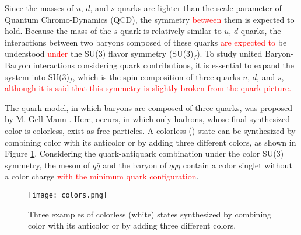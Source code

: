 Since the masses of $u$, $d$, and $s$ quarks are lighter than the scale parameter of Quantum Chromo-Dynamics (QCD), the symmetry \textcolor{red}{between} them is expected to hold. Because the mass of the $s$ quark is relatively similar to $u$, $d$ quarks, the interactions between two baryons composed of these quarks \textcolor{red}{are expected to} be understood \textcolor{red}{under} the SU(3) flavor symmetry (SU(3)$_f$). To study united Baryon-Baryon interactions considering quark contributions, it is essential to expand the system into SU(3)$_f$, which is the spin composition of three quarks $u$, $d$, and $s$, \textcolor{red}{although it is said that this symmetry is slightly broken from the quark picture.}

The quark model, in which baryons are composed of three quarks, was proposed by M. Gell-Mann \cite{mgm-1956} \cite{mgm-1961}. %
Here,  occurs, in which only hadrons, whose final synthesized color is colorless, exist as free particles. A colorless () state can be synthesized by combining color with its anticolor or by adding three different colors, as shown in Figure \ref{fig-colors}. Considering the quark-antiquark combination under the color SU(3) symmetry, the meson of $q\bar{q}$ and the baryon of $qqq$ contain a color singlet without a color charge \textcolor{red}{with the minimum quark configuration}.
\begin{figure}[h!]
  \begin{center}
  \texttt{[image: colors.png]}
  \caption{Three examples of colorless (white) states synthesized by combining color with its anticolor or by adding three different colors.}
  \label{fig-colors}
  \end{center}
\end{figure}

